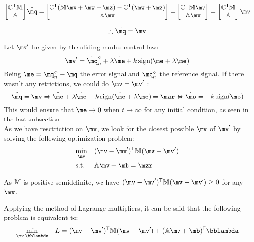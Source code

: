 $ \begin{bmatrix}
\mC^\msT \mM \\
\mA
\end{bmatrix}
\ddot{\mq}
=
\begin{bmatrix}
\mC^\msT ( \mM \mv + \mw + \mz ) - \mC^\msT(\mw + \mz) \\
\mA \mv
\end{bmatrix}
=
\begin{bmatrix}
\mC^\msT  \mM \mv \\
\mA \mv
\end{bmatrix}
=
\begin{bmatrix}
\mC^\msT \mM \\
\mA
\end{bmatrix}
\mv $

\begin{equation} \label{eq:ClosedLoopV}
\therefore \ddot{\mq} = \mv
\end{equation}

Let $\mv'$ be given by the sliding modes control law:
\begin{equation} \label{eq:SMControlowLasV1'}
\mv' = \ddot{\mq}_{n}^\sdia + \lambda \dot{\me} + k \sign (\dot{\me} + \lambda \me)
\end{equation}
Being $ \me = \mq_{n}^\sdia - \mq $ the error signal and $\mq_{n}^\sdia$ the reference signal. If there wasn't any retrictions, we could do $ \mv = \mv' $ :
$$ \ddot{\mq} = \mv \Rightarrow  \ddot{\me} + \lambda \dot{\me} + k \sign (\dot{\me} + \lambda \me) = \mzr \Leftrightarrow \dot{\ms} = - k \sign(\ms)$$
This would ensure that $\me \rightarrow 0$ when $t \rightarrow \infty$ for any initial condition, as seen in the last subsection. \\

As we have resctriction on $\mv$, we look for the closest possible $\mv$ of $\mv'$ 
by solving the following optimization problem:
\begin{equation} \label{eq:Optimization}
\begin{aligned}
& \underset{\mv}{\min}
& & (\mv - \mv')^\msT \mM (\mv - \mv') \\
& \text{s.t.}
& & \mA \mv + \mb = \mzr
\end{aligned}
\end{equation}

As $\mathbb{M}$ is positive-semidefinite, we have $(\mv - \mv')^\msT \mM (\mv - \mv') \geq 0 $ for any $\mv$.

Applying the method of Lagrange multipliers, it can be said that the following problem is equivalent to:
\begin{equation}
\begin{aligned}
& \underset{\mv, \mlambda}{\min}
& & L = (\mv - \mv')^\msT \mM (\mv - \mv') + (\mA \mv + \mb)^\msT \mlambda \\
\end{aligned}
\end{equation}


